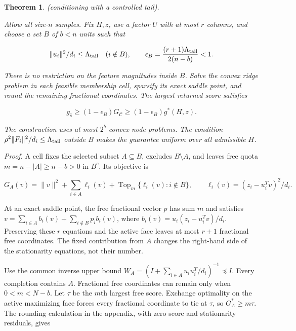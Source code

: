 \documentclass[11pt]{article}
\newtheorem{theorem}{Theorem}
\begin{document}
\begin{theorem}\label{th:6} (conditioning with a controlled tail).

Allow all size-\(n\) samples. Fix \(H,z\), use a factor \(U\) with at
most \(r\) columns, and choose a set \(B\) of \(b<n\) units such that

\begin{equation}\label{eq:28}
\|u_i\|^2/d_i\le\Lambda_{\rm tail}\quad(i\notin B),
\qquad
\epsilon_B=\frac{(r+1)\Lambda_{\rm tail}}{2(n-b)}<1. 
\end{equation}

There is no restriction on the feature magnitudes inside \(B\). Solve
the convex ridge problem in each feasible membership cell, sparsify its
exact saddle point, and round the remaining fractional coordinates. The
largest returned score satisfies

\begin{equation}\label{eq:29}
g_{\widehat s}\ge(1-\epsilon_B)G_{\mathcal C}
\ge(1-\epsilon_B)g^*(H,z). 
\end{equation}

The construction uses at most \(2^b\) convex node problems. The
condition \(\rho^2\|F_i\|^2/d_i\le\Lambda_{\rm tail}\) outside \(B\)
makes the guarantee uniform over all admissible \(H\).

\end{theorem}

\emph{Proof.} A cell fixes the selected subset \(A\subseteq B\),
excludes \(B\setminus A\), and leaves free quota \(m=n-|A|\ge n-b>0\) in
\(B^c\). Its objective is

\[
G_A(v)=\|v\|^2+\sum_{i\in A}\ell_i(v)
+\operatorname{Top}_m\{\ell_i(v):i\notin B\},
\qquad \ell_i(v)=(z_i-u_i^Tv)^2/d_i.
\]

At an exact saddle point, the free fractional vector \(p\) has sum \(m\)
and satisfies \(v=\sum_{i\in A}b_i(v)+\sum_{i\notin B}p_i b_i(v)\),
where \(b_i(v)=u_i(z_i-u_i^Tv)/d_i\). Preserving these \(r\) equations
and the active face leaves at most \(r+1\) fractional free coordinates.
The fixed contribution from \(A\) changes the right-hand side of the
stationarity equations, not their number.

Use the common inverse upper bound
\(W_A=(I+\sum_{i\in A}u_iu_i^T/d_i)^{-1}\preceq I\). Every completion
contains \(A\). Fractional free coordinates can remain only when
\(0<m<N-b\). Let \(\tau\) be the \(m\)th largest free score. Exchange
optimality on the active maximizing face forces every fractional
coordinate to tie at \(\tau\), so \(G_A^*\ge m\tau\). The rounding
calculation in the appendix, with zero score and stationarity residuals,
gives
\end{document}
